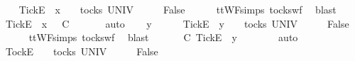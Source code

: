 \ \ \isamarkupfalse%
\ {\isachardoublequoteopen}{\isacharbrackleft}Tick{\isacharbrackright}\isactrlsub E\ {\isacharhash}\ x\ {\isacharhash}\ {\isasymrho}\ {\isasymin}\ tocks\ UNIV{\isachardoublequoteclose}\isanewline
\ \ \isamarkupfalse%
\ \isamarkupfalse%
\ {\isachardoublequoteopen}False{\isachardoublequoteclose}\isanewline
\ \ \ \ \isamarkupfalse%
\ ttWF{\isachardot}simps{\isacharparenleft}{}{}{\isacharparenright}\ tocks{\isacharunderscore}wf\ \isamarkupfalse%
\ blast\isanewline
\ \ \isamarkupfalse%
\ \isamarkupfalse%
\ {\isachardoublequoteopen}{\isacharbrackleft}Tick{\isacharbrackright}\isactrlsub E\ {\isacharhash}\ x\ {\isacharhash}\ {\isasymrho}\ {\isasymlesssim}\isactrlsub C\ {\isasymsigma}{\isacharprime}{\isacharprime}{\isachardoublequoteclose}\isanewline
\ \ \ \ \isamarkupfalse%
\ auto\isanewline
{}\isamarkupfalse%
\isanewline
\ \ \isamarkupfalse%
\ y\ {\isasymrho}\ {\isasymsigma}{\isacharprime}{\isacharprime}\isanewline
\ \ \isamarkupfalse%
\ {\isachardoublequoteopen}{\isacharbrackleft}Tick{\isacharbrackright}\isactrlsub E\ {\isacharhash}\ y\ {\isacharhash}\ {\isasymsigma}{\isacharprime}{\isacharprime}\ {\isasymin}\ tocks\ UNIV{\isachardoublequoteclose}\isanewline
\ \ \isamarkupfalse%
\ \isamarkupfalse%
\ {\isachardoublequoteopen}False{\isachardoublequoteclose}\isanewline
\ \ \ \ \isamarkupfalse%
\ ttWF{\isachardot}simps{\isacharparenleft}{}{}{\isacharparenright}\ tocks{\isacharunderscore}wf\ \isamarkupfalse%
\ blast\isanewline
\ \ \isamarkupfalse%
\ \isamarkupfalse%
\ {\isachardoublequoteopen}{\isasymrho}\ {\isasymlesssim}\isactrlsub C\ {\isacharbrackleft}Tick{\isacharbrackright}\isactrlsub E\ {\isacharhash}\ y\ {\isacharhash}\ {\isasymsigma}{\isacharprime}{\isacharprime}{\isachardoublequoteclose}\isanewline
\ \ \ \ \isamarkupfalse%
\ auto\isanewline
{}\isamarkupfalse%
\isanewline
\ \ \isamarkupfalse%
\ {\isasymrho}\ {\isasymsigma}{\isacharprime}{\isacharprime}\isanewline
\ \ \isamarkupfalse%
\ {\isachardoublequoteopen}{\isacharbrackleft}Tock{\isacharbrackright}\isactrlsub E\ {\isacharhash}\ {\isasymrho}\ {\isasymin}\ tocks\ UNIV{\isachardoublequoteclose}\isanewline
\ \ \isamarkupfalse%
\ \isamarkupfalse%
\ {\isachardoublequoteopen}False{\isachardoublequoteclose}\isanewline
